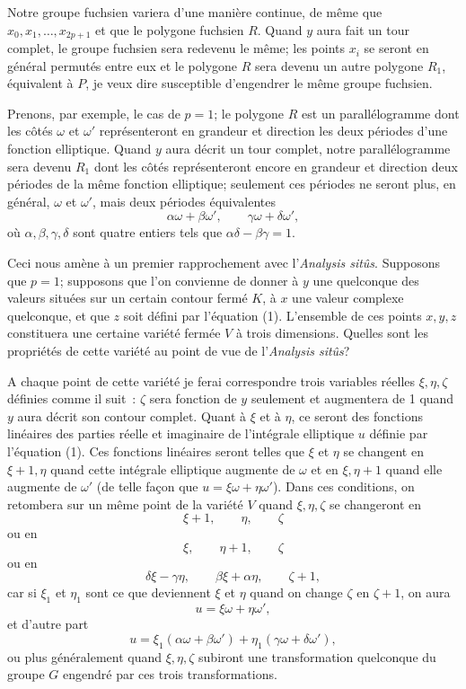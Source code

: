 \documentclass{article}
\begin{document}
Notre groupe fuchsien variera d'une manière continue, de même que $x_{0}, x_{1}, \ldots, x_{2p+1}$ et que le polygone fuchsien $R$. Quand $y$ aura fait un tour complet, le groupe fuchsien sera redevenu le même; les points $x_{i}$ se seront en général permutés entre eux et le polygone $R$ sera devenu un autre polygone $R_{1}$, équivalent à $P$, je veux dire susceptible d'engendrer le même groupe fuchsien.

Prenons, par exemple, le cas de $p = 1$; le polygone $R$ est un parallélogramme dont les côtés $\omega$ et $\omega'$ représenteront en grandeur et direction les deux périodes d'une fonction elliptique. Quand $y$ aura décrit un tour complet, notre parallélogramme sera devenu $R_{1}$ dont les côtés représenteront encore en grandeur et direction deux périodes de la même fonction elliptique; seulement ces périodes ne seront plus, en général, $\omega$ et $\omega'$, mais deux périodes équivalentes
\[ \alpha\omega + \beta\omega', \qquad \gamma\omega + \delta\omega', \]
où $\alpha, \beta, \gamma, \delta$ sont quatre entiers tels que $\alpha\delta - \beta\gamma = 1$.

Ceci nous amène à un premier rapprochement avec l'\emph{Analysis sitûs}. Supposons que $p = 1$; supposons que l'on convienne de donner à $y$ une quelconque des valeurs situées sur un certain contour fermé $K$, à $x$ une valeur complexe quelconque, et que $z$ soit défini par l'équation (1). L'ensemble de ces points $x, y, z$ constituera une certaine variété fermée $V$ à trois dimensions. Quelles sont les propriétés de cette variété au point de vue de l'\emph{Analysis sitûs}?

A chaque point de cette variété je ferai correspondre trois variables réelles $\xi, \eta, \zeta$ définies comme il suit~: $\zeta$ sera fonction de $y$ seulement et augmentera de 1 quand $y$ aura décrit son contour complet. Quant à $\xi$ et à $\eta$, ce seront des fonctions linéaires des parties réelle et imaginaire de l'intégrale elliptique $u$ définie par l'équation (1). Ces fonctions linéaires seront telles que $\xi$ et $\eta$ se changent en $\xi + 1, \eta$ quand cette intégrale elliptique augmente de $\omega$ et en $\xi, \eta + 1$ quand elle augmente de $\omega'$ (de telle façon que
$u = \xi\omega + \eta\omega'$). Dans ces conditions, on retombera sur un même point de la variété $V$ quand $\xi, \eta, \zeta$ se changeront en
\[ \xi + 1, \qquad \eta, \qquad \zeta \]
ou en
\[ \xi, \qquad \eta + 1, \qquad \zeta \]
ou en
\[ \delta\xi - \gamma\eta, \qquad \beta\xi + \alpha\eta, \qquad \zeta + 1, \]
car si $\xi_{1}$ et $\eta_{1}$ sont ce que deviennent $\xi$ et $\eta$ quand on change $\zeta$ en $\zeta + 1$, on aura
\[ u = \xi\omega + \eta\omega', \]
et d'autre part
\[ u = \xi_{1}(\alpha\omega + \beta\omega') + \eta_{1}(\gamma\omega + \delta\omega'), \]
ou plus généralement quand $\xi, \eta, \zeta$ subiront une transformation quelconque du groupe $G$ engendré par ces trois transformations.
\end{document}
